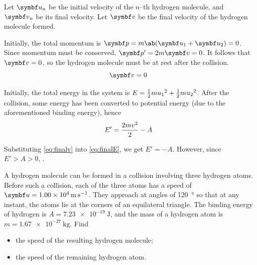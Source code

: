 Let \(\mv{u}_n\) be the initial velocity of the \(n\)--th hydrogen
molecule, and
\(\mv{v}_n\) be its final velocity. Let \(\mv{v}\) be the final
velocity of the
hydrogen molecule formed.

Initially, the total momentum is \(\mv{p} = m\ab(\mv{u}_1 + \mv{u}_2)
= 0\). Since momentum
must be conserved, \(\mv{p}' = 2m\mv{v} = 0\). It follows that
\(\mv{v} = 0\), so
the hydrogen molecule must be at rest after the collision.
\begin{equation}
  \mv{v} = 0
  \label{eq:finalv}
\end{equation}

Initially, the total energy in the system is \(E = \frac{1}{2}m{u_1}^2 +
\frac{1}{2}m{u_2}^2\).
After the collision, some energy has been converted to potential
energy (due to the aforementioned binding energy),
hence
\begin{equation}
  E' = \frac{2mv^2}{2} - A
  \label{eq:finalE}
\end{equation}

Substituting \cref{eq:finalv} into \cref{eq:finalE}, we get \(E' = -A\).
However, since \(E' > A > 0\), .

\begin{problem}
  A hydrogen molecule can be formed in a collision involving three
  hydrogen atoms.
  Before such a collision, each of the three atoms has a speed of
  \(\mv{u}=\qty{1.00e4}{\metre\per\second}\). They approach at angles
  of \qty{120}{\degree}
  so that at any instant, the atoms lie at the corners of an
  equilateral triangle.
  The binding energy of hydrogen is \(A = \qty{7.23e-19}{\joule}\), and the mass
  of a hydrogen atom is \(m = \qty{1.67e-27}{\kg}\). Find
  \begin{itemize}
    \item the speed of the resulting hydrogen molecule;
    \item the speed of the remaining hydrogen atom.
  \end{itemize}
\end{problem}


